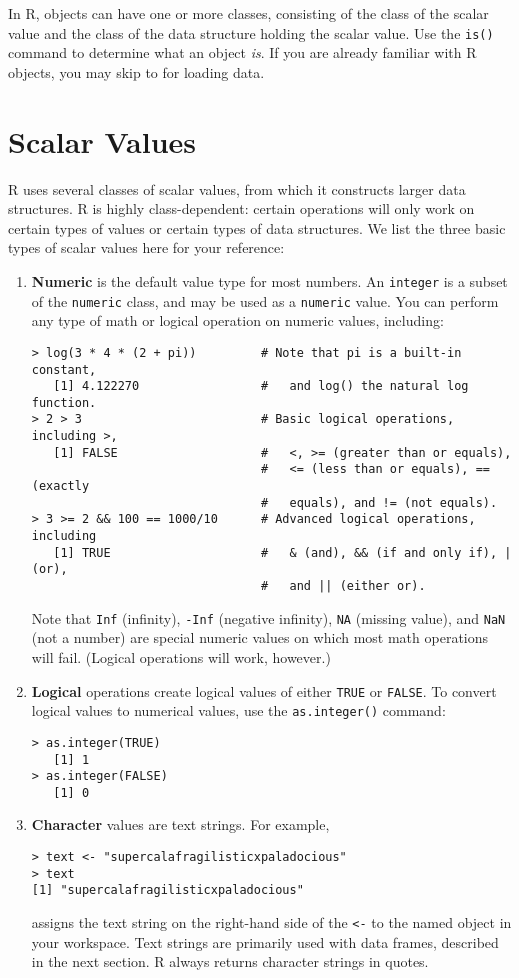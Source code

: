 In R, objects can have one or more classes, consisting of the class of
the scalar value and the class of the data structure holding the
scalar value.  Use the {\tt is()} command to determine what an object
\emph{is}.  If you are already familiar with R objects, you may skip
to  for loading data.

\section{Scalar Values}\label{variables}

R uses several classes of scalar values, from which it constructs 
larger data structures.  R is highly class-dependent: certain
operations will only work on certain types of values or certain types
of data structures.  We list the three basic types of scalar values
here for your reference:  

\begin{enumerate}
\item \textbf{Numeric} is the default value type for most numbers.  An
  \texttt{integer} is a subset of the \texttt{numeric} class, and may
  be used as a \texttt{numeric} value.  You can perform
  any type of math or logical operation on numeric values,
  including:
\begin{verbatim}
> log(3 * 4 * (2 + pi))         # Note that pi is a built-in constant, 
   [1] 4.122270                 #   and log() the natural log function.
> 2 > 3                         # Basic logical operations, including >,
   [1] FALSE                    #   <, >= (greater than or equals), 
                                #   <= (less than or equals), == (exactly 
                                #   equals), and != (not equals). 
> 3 >= 2 && 100 == 1000/10      # Advanced logical operations, including
   [1] TRUE                     #   & (and), && (if and only if), | (or), 
                                #   and || (either or).
\end{verbatim}
  Note that \texttt{Inf} (infinity), \texttt{-Inf} (negative
  infinity), \texttt{NA} (missing value), and \texttt{NaN} (not a
  number) are special numeric values on which most math operations
  will fail.  (Logical operations will work, however.)

\item \textbf{Logical} operations create logical values of either
  \texttt{TRUE} or \texttt{FALSE}.  To convert logical values to
  numerical values, use the \texttt{as.integer()} command:
\begin{verbatim}
> as.integer(TRUE)
   [1] 1 
> as.integer(FALSE)
   [1] 0
\end{verbatim}
\item \textbf{Character} values are text strings.  For example, 
\begin{verbatim}
> text <- "supercalafragilisticxpaladocious"
> text
[1] "supercalafragilisticxpaladocious"
\end{verbatim}
  assigns the text string on the right-hand side of the \texttt{<-} to
  the named object in your workspace.  Text strings are primarily used
  with data frames, described in the next section.  R always returns
  character strings in quotes.
\end{enumerate}

